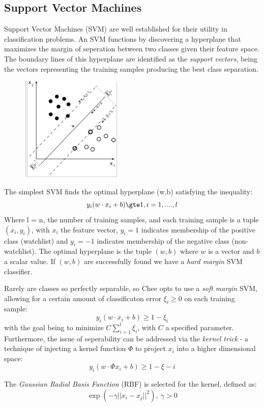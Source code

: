 \documentclass[twoside,11pt]{article}
\begin{document}
\subsection{Support Vector Machines}
Support Vector Machines (SVM) \citep{Cortes, Vapnik} are well established for their utility in classification problems. An SVM functions by discovering a hyperplane that maximizes the margin of seperation between two classes given their feature space. The boundary lines of this hyperplane are identified as the \textit{support vectors}, being the vectors representing the training samples producing the best class separation.

\includegraphics[width=7cm, height=5cm]{SVM.png}

The simplest SVM finds the optimal hyperplane (w,b) satisfying the inequality:
\[
  y_{i}(w \cdot x_{i} + b) \gte 1,  i = 1, ...., l
\]
Where l = n, the number of training samples, and each training sample is a tuple $(x_{i}, y_{i})$, with $x_{i}$ the feature vector, $y_{i} = 1$ indicates membership of the positive class (watchlist) and $y_{i} = -1$ indicates membership of the negative class (non-watchlist). The optimal hyperplane is the tuple $(w, b)$ where $w$ is a vector and $b$ a scalar value. If $(w, b)$ are successfully found we have a \textit{hard margin} SVM classifier.

Rarely are classes so perfectly separable, so Chee opts to use a \textit{soft margin} SVM, allowing for a certain amount of classificaton error $\xi_{i} \geq 0$ on each training sample:
\[
  y_{i}(w \cdot x_{i} + b) \geq 1 - \xi_{i}
\]
with the goal being to minimize $C\sum_{i=1}^{l} \xi_{i}$, with $C$ a specified parameter. Furthermore, the issue of seperability can be addressed via the \textit{kernel trick} - a technique of injecting a kernel function $\Phi$ to project $x_{i}$ into a higher dimensional space:
\[
  y_{i}(w \cdot \Phi{x_{i}} + b) \geq 1 - \xi-{i}
\]

The \textit{Gaussian Radial Basis Function} (RBF) is selected for the kernel, defined as:
\[
  \exp(-\gamma||x_{i} - x_{j}||^{2}),\ \gamma > 0
\]
\end{document}
